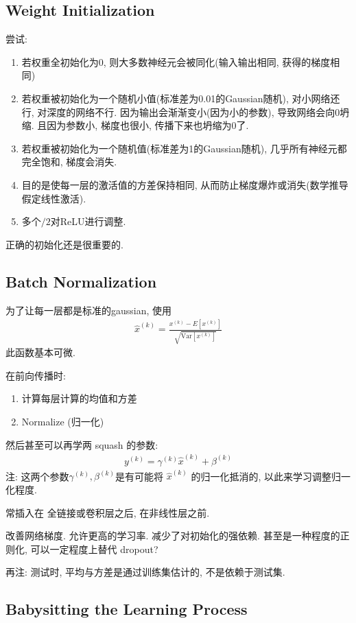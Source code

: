 \subsection{Weight Initialization}
尝试: 
\begin{enumerate}
    \item 若权重全初始化为0, 则大多数神经元会被同化(输入输出相同, 获得的梯度相同)
    \item 若权重被初始化为一个随机小值(标准差为0.01的Gaussian随机), 对小网络还行, 对深度的网络不行.  因为输出会渐渐变小(因为小的参数), 导致网络会向0坍缩. 且因为参数小, 梯度也很小, 传播下来也坍缩为0了. 
    \item 若权重被初始化为一个随机值(标准差为1的Gaussian随机), 几乎所有神经元都完全饱和, 梯度会消失. 
    \item 目的是使每一层的激活值的方差保持相同, 从而防止梯度爆炸或消失(数学推导假定线性激活). 
    \item 多个$/2$对ReLU进行调整. 
\end{enumerate}

正确的初始化还是很重要的. 

\subsection{Batch Normalization}
为了让每一层都是标准的gaussian, 使用
\begin{align*}
    \hat{x}^{(k)}=\frac{x^{(k)}-E\left[ x^{(k)} \right]}{\sqrt{\text{Var}\left[ x^{(k)} \right]}}
\end{align*}
此函数基本可微. 

在前向传播时:
\begin{enumerate}
    \item 计算每层计算的均值和方差
    \item Normalize (归一化)
\end{enumerate}

然后甚至可以再学两 squash 的参数:
\begin{align*}
    y^{(k)}=\gamma^{(k)}\hat{x}^{(k)}+\beta^{(k)}
\end{align*}
注: 这两个参数$\gamma^{(k)}, \beta^{(k)}$是有可能将 $\hat{x}^{(k)}$ 的归一化抵消的, 以此来学习调整归一化程度.

常插入在 全链接或卷积层之后, 在非线性层之前. 

改善网络梯度. 允许更高的学习率. 减少了对初始化的强依赖. 甚至是一种程度的正则化, 可以一定程度上替代 dropout?

再注: 测试时, 平均与方差是通过训练集估计的, 不是依赖于测试集. 


\subsection{Babysitting the Learning Process}
